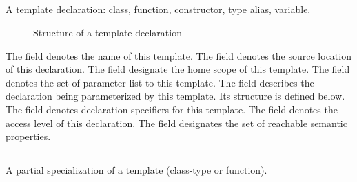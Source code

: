 \subsection{}
\label{sec:ifc:DeclSort:Template}

A template declaration: class, function, constructor, type alias, variable.

\begin{figure}[H]
	\centering
	\caption{Structure of a template declaration}
	\label{fig:ifc-template-decl-structure}
\end{figure}

The  field denotes the name of this template.
The  field denotes the source location of this declaration.
The  field designate the home scope of this template.
The  field denotes the set of parameter list to this template.
The  field describes the declaration being parameterized by this template.  Its structure is defined below.
The  field denotes declaration specifiers for this template.
The  field denotes the access level of this declaration.
The  field designates the set of reachable semantic properties.


\subsection{}
\label{sec:ifc:DeclSort:PartialSpecialization}

A partial specialization of a
template (class-type or function). 

